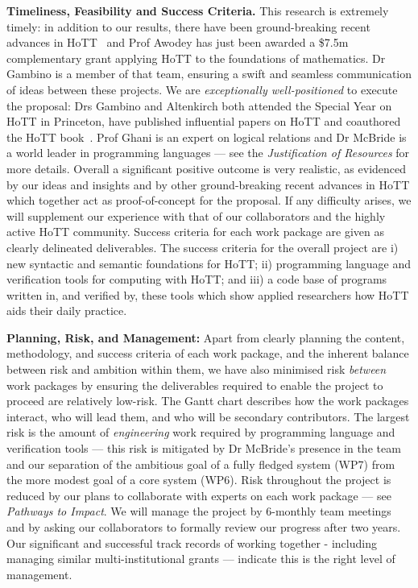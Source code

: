 \documentclass[a4paper,11pt]{article}
\begin{document}

{\bf Timeliness, Feasibility and Success Criteria.}  This research is
extremely timely: in addition to our results, there have been
ground-breaking recent advances in
HoTT~\cite{ShulmanM:uniidh,BezemM:cubsmt, nominal} and Prof Awodey has
just been awarded a \$7.5m complementary grant applying HoTT to the
foundations of mathematics. Dr Gambino is a member of that team,
ensuring a swift and seamless communication of ideas between these
projects. We are {\em exceptionally well-positioned} to execute the
proposal: Drs Gambino and Altenkirch both attended the Special Year on
HoTT in Princeton, have published influential papers on HoTT and
coauthored the HoTT book~\cite{hott-book}. Prof Ghani is an expert on
logical relations and Dr McBride is a world leader in programming
languages --- see the {\em Justification of Resources} for more
details. Overall a significant positive outcome is very realistic, as
evidenced by our ideas and insights and by other ground-breaking
recent advances in HoTT which together act as proof-of-concept for the
proposal. If any difficulty arises, we will supplement
our experience with that of our collaborators and the highly active
HoTT community. Success criteria for each work package are given as
clearly delineated deliverables.  The success criteria for the overall
project are i) new syntactic and semantic foundations for HoTT; ii)
programming language and verification tools for computing with HoTT;
and iii) a code base of programs written in, and verified by, these
tools which show applied researchers how HoTT aids their daily
practice.


{\bf Planning, Risk, and Management:} Apart from clearly
planning the content, methodology, and success criteria of each work package,
and the inherent balance between risk and ambition
within them, we have also minimised risk {\em between} work packages
by ensuring the deliverables required to enable the project to proceed 
are relatively low-risk. The Gantt chart describes how the work
packages interact, who will lead them, and who will be secondary
contributors. The largest risk is the 
amount of {\em engineering} work required by programming language
and verification tools --- this risk is mitigated by Dr McBride's
presence in the team and our 
separation of the ambitious
goal of a fully fledged system (WP7) from the more modest
goal of a core system (WP6). Risk throughout the project is reduced by
our plans to collaborate
with experts on each work package --- see {\em Pathways to Impact}. We
will manage the project by 6-monthly team meetings and by asking our
collaborators to formally review our progress after two years.  Our
significant and successful track records of working together -
including managing similar multi-institutional grants --- indicate
this is the right level of management.
\end{document}
